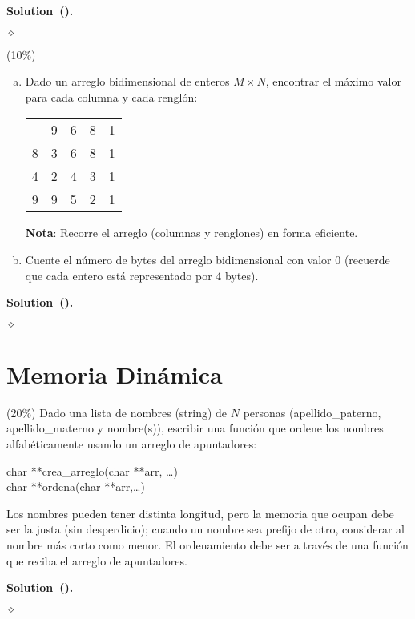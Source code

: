 \documentclass{article}
\theoremstyle{problemstyle}
\newenvironment{solution}[2]{%
  \begin{mdframed}[linewidth=0.8pt,linecolor=Gray,backgroundcolor=Gray!5,roundcorner=5pt, nobreak=#2]%
    \noindent\textbf{Solution\if\relax\detokenize{#1}\relax\else~(#1)\fi.}%
}{%
\hfill $ \diamond $ 
  \end{mdframed}%
}
\begin{document}
\begin{solution}{}{false}
  
\end{solution}

\begin{problem}
(10\%)
\begin{enumerate}[a)]
	\item Dado un arreglo bidimensional de enteros $ M\times N $, encontrar el m\'aximo valor para cada columna y cada rengl\'on:
	      \setlength\doublerulesep{0.5pt}
	      \begin{center}
		      \begin{tabular}[c]{|c||c|c|c|c|}
			      \hline
			        & 9 & 6 & 8 & 1 \\
			      \hhline{|=#=|=|=|=|}
			      8 & 3 & 6 & 8 & 1 \\
			      \hline
			      4 & 2 & 4 & 3 & 1 \\
			      \hline
			      9 & 9 & 5 & 2 & 1 \\
			      \hline
		      \end{tabular}
	      \end{center}
	      \textbf{Nota}: Recorre el arreglo (columnas y renglones) en forma eficiente.

	\item Cuente el n\'umero de bytes del arreglo bidimensional con valor 0 (recuerde que cada entero est\'a representado por 4 bytes).
\end{enumerate}

\end{problem}
\begin{solution}{}{true}

\end{solution}


\section*{Memoria Din\'amica}\label{sec:memoria_din_amica} %
\begin{problem}
(20\%) Dado una lista de nombres (string) de $ N $ personas (apellido\_paterno, apellido\_materno y nombre(s)), escribir una funci\'on que ordene los nombres alfab\'eticamente usando un arreglo de apuntadores:
\begin{center}
	char **crea\_arreglo(char **arr, \dots)\\
	char **ordena(char **arr,\dots)
\end{center}
Los nombres pueden tener distinta longitud, pero la memoria que ocupan debe ser la justa (sin desperdicio); cuando un nombre sea prefijo de otro, considerar al nombre m\'as corto como menor. El ordenamiento debe ser a trav\'es de una funci\'on que reciba el arreglo de apuntadores.
\end{problem}
\begin{solution}{}{true}

\end{solution}
\end{document}
